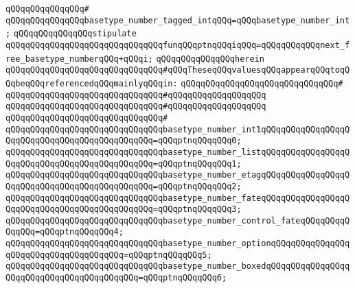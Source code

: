 \verb|qQQqqQQqqQQqqQQq#|\newline
\verb|qQQqqQQqqQQqqQQqbasetype_number_tagged_intqQQq=qQQqbasetype_number_int;|\newline
\newline
\verb|qQQqqQQqqQQqqQQqstipulate|\newline
\verb|qQQqqQQqqQQqqQQqqQQqqQQqqQQqqQQqfunqQQqptnqQQqiqQQq=qQQqqQQqqQQqnext_free_basetype_numberqQQq+qQQqi;|\newline
\verb|qQQqqQQqqQQqqQQqherein|\newline
\newline
\verb|qQQqqQQqqQQqqQQqqQQqqQQqqQQqqQQq#qQQqTheseqQQqvaluesqQQqappearqQQqtoqQQqbeqQQqreferencedqQQqmainlyqQQqin:|\newline
\verb|qQQqqQQqqQQqqQQqqQQqqQQqqQQqqQQq#|\newline
\verb|qQQqqQQqqQQqqQQqqQQqqQQqqQQqqQQq#qQQqqQQqqQQqqQQqqQQq|\newline
\verb|qQQqqQQqqQQqqQQqqQQqqQQqqQQqqQQq#qQQqqQQqqQQqqQQqqQQq|\newline
\verb|qQQqqQQqqQQqqQQqqQQqqQQqqQQqqQQq#|\newline
\verb|qQQqqQQqqQQqqQQqqQQqqQQqqQQqqQQqbasetype_number_int1qQQqqQQqqQQqqQQqqQQqqQQqqQQqqQQqqQQqqQQqqQQqqQQq=qQQqptnqQQqqQQq0;|\newline
\verb|qQQqqQQqqQQqqQQqqQQqqQQqqQQqqQQqbasetype_number_listqQQqqQQqqQQqqQQqqQQqqQQqqQQqqQQqqQQqqQQqqQQqqQQq=qQQqptnqQQqqQQq1;|\newline
\verb|qQQqqQQqqQQqqQQqqQQqqQQqqQQqqQQqbasetype_number_etagqQQqqQQqqQQqqQQqqQQqqQQqqQQqqQQqqQQqqQQqqQQqqQQq=qQQqptnqQQqqQQq2;|\newline
\verb|qQQqqQQqqQQqqQQqqQQqqQQqqQQqqQQqbasetype_number_fateqQQqqQQqqQQqqQQqqQQqqQQqqQQqqQQqqQQqqQQqqQQqqQQq=qQQqptnqQQqqQQq3;|\newline
\verb|qQQqqQQqqQQqqQQqqQQqqQQqqQQqqQQqbasetype_number_control_fateqQQqqQQqqQQqqQQq=qQQqptnqQQqqQQq4;|\newline
\verb|qQQqqQQqqQQqqQQqqQQqqQQqqQQqqQQqbasetype_number_optionqQQqqQQqqQQqqQQqqQQqqQQqqQQqqQQqqQQqqQQq=qQQqptnqQQqqQQq5;|\newline
\verb|qQQqqQQqqQQqqQQqqQQqqQQqqQQqqQQqbasetype_number_boxedqQQqqQQqqQQqqQQqqQQqqQQqqQQqqQQqqQQqqQQqqQQq=qQQqptnqQQqqQQq6;|\newline
